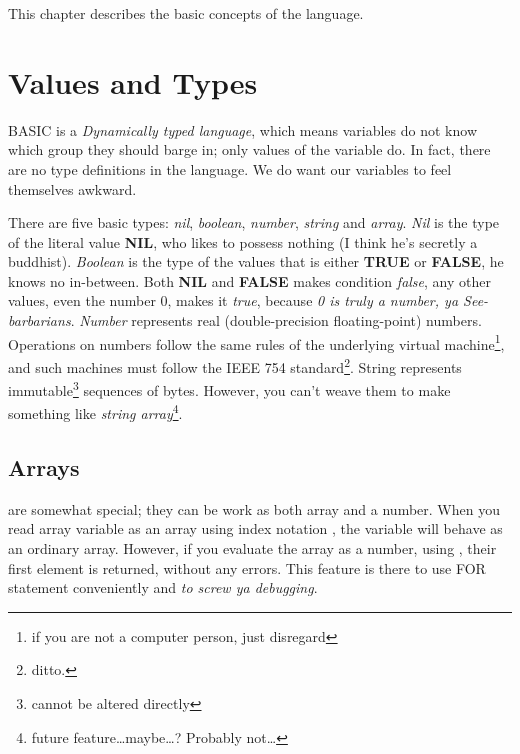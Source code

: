 This chapter describes the basic concepts of the language.


\section{Values and Types}

BASIC is a \emph{Dynamically typed language}, which means variables do not know which group they should barge in; only values of the variable do. In fact, there are no type definitions in the language. We do want our variables to feel themselves awkward.

There are five basic types: \emph{nil}, \emph{boolean}, \emph{number}, \emph{string} and \emph{array}. \emph{Nil} is the type of the literal value \textbf{NIL}, who likes to possess nothing (I think he's secretly a buddhist). \emph{Boolean} is the type of the values that is either \textbf{TRUE} or \textbf{FALSE}, he knows no in-between. Both \textbf{NIL} and \textbf{FALSE} makes condition \emph{false}, any other values, even the number 0, makes it \emph{true}, because \emph{0 is truly a number, ya See-barbarians}. \emph{Number} represents real (double-precision floating-point) numbers. Operations on numbers follow the same rules of the underlying virtual machine\footnote{if you are not a computer person, just disregard}, and such machines must follow the IEEE 754 standard\footnote{ditto.}. String represents immutable\footnote{cannot be altered directly} sequences of bytes. However, you can't weave them to make something like \emph{string array}\footnote{future feature\ldots maybe\ldots? Probably not\ldots}.

\subsection{Arrays} are somewhat special; they can be work as both array and a number. When you read array variable as an array using index notation , the variable will behave as an ordinary array. However, if you evaluate the array as a number, using , their first element is returned, without any errors. This feature is there to use FOR statement conveniently and \emph{to screw ya debugging}.